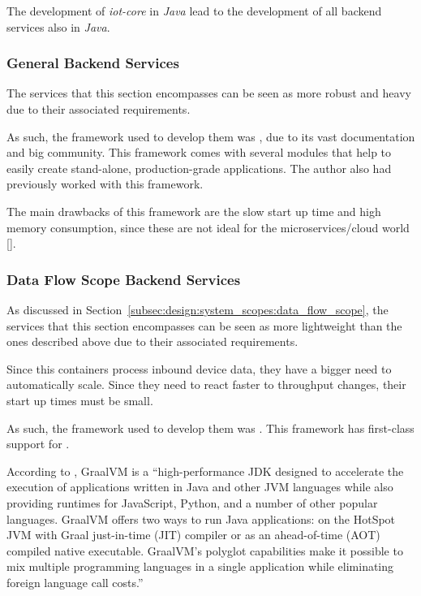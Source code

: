 The development of \textit{iot-core} in \textit{Java} lead to the development of all backend services also in \textit{Java}.

\subsubsection{General Backend Services}
\label{subsubsec:implementation:decisions:backend:geral}

The services that this section encompasses can be seen as more robust and heavy due to their associated requirements.

As such, the framework used to develop them was , due to its vast documentation and big community. This framework comes with several modules that help to easily create stand-alone, production-grade applications. The author also had previously worked with this framework.

The main drawbacks of this framework are the slow start up time and high memory consumption, since these are not ideal for the microservices/cloud world [\cite{springslow}].

\subsubsection{Data Flow Scope Backend Services}
\label{subsubsec:implementation:decisions:backend:flow}

As discussed in Section~\ref{subsec:design:system_scopes:data_flow_scope}, the services that this section encompasses can be seen as more lightweight than the ones described above due to their associated requirements.

Since this containers process inbound device data, they have a bigger need to automatically scale. Since they need to react faster to throughput changes, their start up times must be small.

As such, the framework used to develop them was . This framework has first-class support for .

According to \cite{graalvm-intro}, GraalVM is a ``high-performance JDK designed to accelerate the execution of applications written in Java and other JVM languages while also providing runtimes for JavaScript, Python, and a number of other popular languages. GraalVM offers two ways to run Java applications: on the HotSpot JVM with Graal just-in-time (JIT) compiler or as an ahead-of-time (AOT) compiled native executable. GraalVM's polyglot capabilities make it possible to mix multiple programming languages in a single application while eliminating foreign language call costs.''

